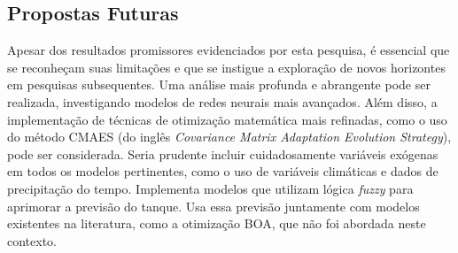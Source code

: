 %
%



\subsection{Propostas Futuras}

Apesar dos resultados promissores evidenciados por esta pesquisa, é essencial que se reconheçam suas limitações e que se instigue a exploração de novos horizontes em pesquisas subsequentes. Uma análise mais profunda e abrangente pode ser realizada, investigando modelos de redes neurais mais avançados. Além disso, a implementação de técnicas de otimização matemática mais refinadas, como o uso do método CMAES (do inglês \textit{Covariance Matrix Adaptation Evolution Strategy}), pode ser considerada. Seria prudente incluir cuidadosamente variáveis exógenas em todos os modelos pertinentes, como o uso de variáveis climáticas e dados de precipitação do tempo.
Implementa modelos que utilizam lógica \textit{fuzzy} para aprimorar a previsão do tanque. Usa essa previsão juntamente com modelos existentes na literatura, como a otimização BOA, que não foi abordada neste contexto.




